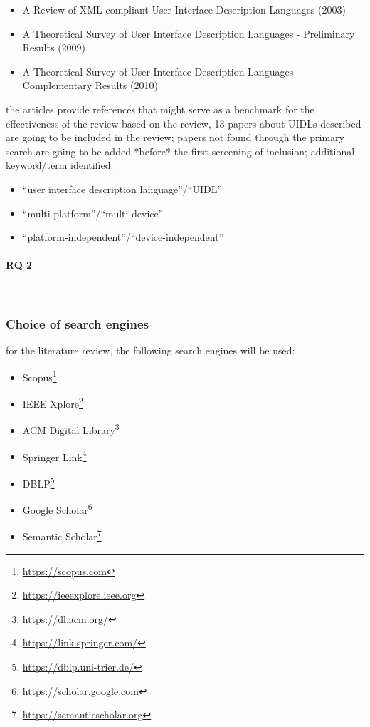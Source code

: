 \begin{itemize}
    \item A Review of XML-compliant User Interface Description Languages (2003)
    \item A Theoretical Survey of User Interface Description Languages - Preliminary Results (2009)
    \item A Theoretical Survey of User Interface Description Languages - Complementary Results (2010)
\end{itemize}

the articles provide references that might serve as a benchmark for the effectiveness of the review 
based on the review, 13 papers about UIDLs 
described are going to be included in the review;
papers not found through the primary search are going to be added *before* the first screening of inclusion;
additional keyword/term identified:
\begin{itemize}
    \item \enquote{user interface description language}/\enquote{UIDL}
    \item \enquote{multi-platform}/\enquote{multi-device}
    \item \enquote{platform-independent}/\enquote{device-independent}
\end{itemize}

\paragraph{RQ 2}
--- 

\subsubsection{Choice of search engines}
for the literature review, the following search engines will be used:
\begin{itemize}
    \item Scopus\footnote{\url{https://scopus.com}}
    \item IEEE Xplore\footnote{\url{https://ieeexplore.ieee.org}}
    \item ACM Digital Library\footnote{\url{https://dl.acm.org/}}
    \item Springer Link\footnote{\url{https://link.springer.com/}}
    \item DBLP\footnote{\url{https://dblp.uni-trier.de/}}
    \item Google Scholar\footnote{\url{https://scholar.google.com}}
    \item Semantic Scholar\footnote{\url{https://semanticscholar.org}}
\end{itemize}


